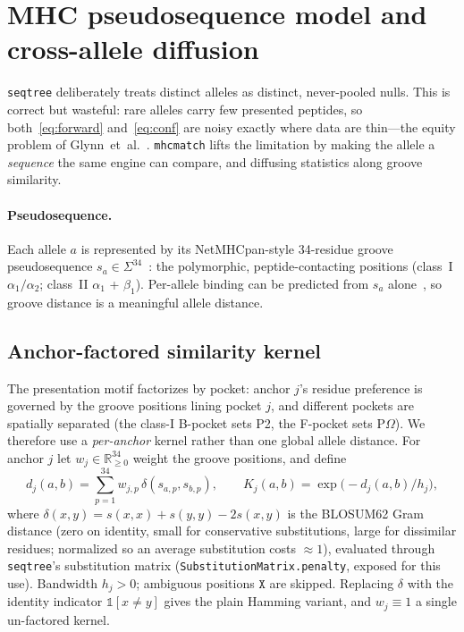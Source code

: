 \documentclass[11pt]{article}
\theoremstyle{oldplain}
\theoremstyle{oldrem}
\newcommand{\R}{\mathbb{R}}
\newcommand{\one}{\mathds{1}}
\begin{document}
\section{MHC pseudosequence model and cross-allele diffusion}\label{sec:diffusion}
\texttt{seqtree} deliberately treats distinct alleles as distinct, never-pooled nulls. This is
correct but wasteful: rare alleles carry few presented peptides, so both~\eqref{eq:forward}
and~\eqref{eq:conf} are noisy exactly where data are thin---the equity problem of
Glynn~et~al.~\cite{Glynn2025}. \texttt{mhcmatch} lifts the limitation by making the allele a
\emph{sequence} the same engine can compare, and diffusing statistics along groove similarity.

\paragraph{Pseudosequence.} Each allele $a$ is represented by its NetMHCpan-style 34-residue groove
pseudosequence $s_a\in\Sigma^{34}$~\cite{Reynisson2020}: the polymorphic, peptide-contacting
positions (class~I $\alpha_1/\alpha_2$; class~II $\alpha_1$ + $\beta_1$). Per-allele binding can be
predicted from $s_a$ alone~\cite{Glynn2025,BassaniSternberg2017}, so groove distance is a meaningful
allele distance.

\subsection{Anchor-factored similarity kernel}
The presentation motif factorizes by pocket: anchor $j$'s residue preference is governed by the
groove positions lining pocket $j$, and different pockets are spatially separated (the class-I
B-pocket sets P2, the F-pocket sets P$\Omega$). We therefore use a \emph{per-anchor} kernel rather
than one global allele distance. For anchor $j$ let $w_j\in\R_{\ge0}^{34}$ weight the groove
positions, and define
\begin{equation}\label{eq:kernel}
  d_j(a,b)=\sum_{p=1}^{34} w_{j,p}\,\delta(s_{a,p}, s_{b,p}),\qquad
  K_j(a,b)=\exp\!\big(-d_j(a,b)/h_j\big),
\end{equation}
where $\delta(x,y)=s(x,x)+s(y,y)-2 s(x,y)$ is the BLOSUM62 Gram distance (zero on identity, small for
conservative substitutions, large for dissimilar residues; normalized so an average substitution
costs $\approx 1$), evaluated through \texttt{seqtree}'s substitution matrix
(\texttt{SubstitutionMatrix.penalty}, exposed for this use). Bandwidth $h_j>0$; ambiguous positions
$\texttt{X}$ are skipped. Replacing $\delta$ with the identity indicator $\one[x\neq y]$ gives the
plain Hamming variant, and $w_j\equiv 1$ a single un-factored kernel.
\end{document}
